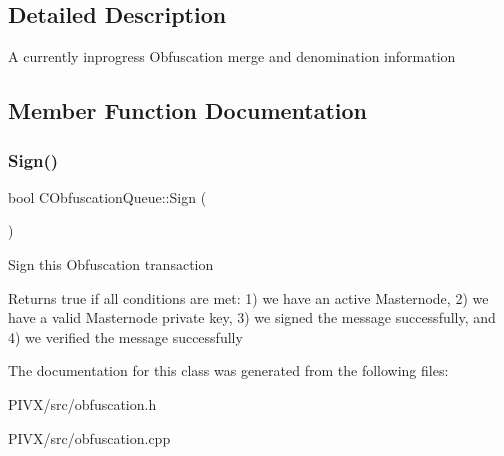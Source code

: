 \subsection{Detailed Description}
A currently inprogress Obfuscation merge and denomination information 

\subsection{Member Function Documentation}
\mbox{\label{class_c_obfuscation_queue_a7d7be50e6c9ca531f4a4b69a3f7c0b79}} 
\subsubsection{\texorpdfstring{Sign()}{Sign()}}
{\footnotesize\ttfamily bool C\+Obfuscation\+Queue\+::\+Sign (\begin{DoxyParamCaption}{ }\end{DoxyParamCaption})}

Sign this Obfuscation transaction \begin{DoxyReturn}{Returns}
true if all conditions are met\+: 1) we have an active Masternode, 2) we have a valid Masternode private key, 3) we signed the message successfully, and 4) we verified the message successfully 
\end{DoxyReturn}


The documentation for this class was generated from the following files\+:\begin{DoxyCompactItemize}
\item 
P\+I\+V\+X/src/obfuscation.\+h\item 
P\+I\+V\+X/src/obfuscation.\+cpp\end{DoxyCompactItemize}
